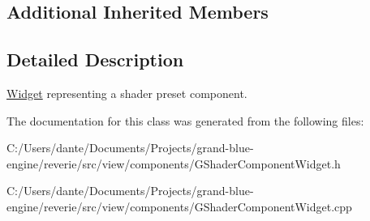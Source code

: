 \subsection*{Additional Inherited Members}


\subsection{Detailed Description}
\mbox{\hyperlink{class_widget}{Widget}} representing a shader preset component. 

The documentation for this class was generated from the following files\+:\begin{DoxyCompactItemize}
\item 
C\+:/\+Users/dante/\+Documents/\+Projects/grand-\/blue-\/engine/reverie/src/view/components/G\+Shader\+Component\+Widget.\+h\item 
C\+:/\+Users/dante/\+Documents/\+Projects/grand-\/blue-\/engine/reverie/src/view/components/G\+Shader\+Component\+Widget.\+cpp\end{DoxyCompactItemize}
